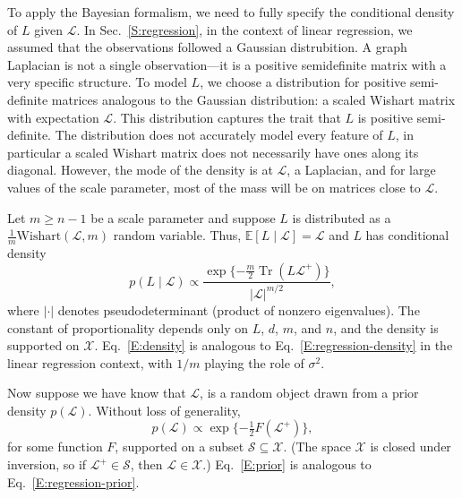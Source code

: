 \documentclass[12pt]{article}
\DeclareMathOperator*{\Tr}{Tr}
\newcommand{\E}{\mathbb{E}}
\theoremstyle{plain}
\begin{document}
To apply the Bayesian formalism, we need to fully specify the
conditional density of $L$ given $\mathcal{L}$.  In
Sec.~\ref{S:regression}, in the context of linear regression, we
assumed that the observations followed a Gaussian distrubition.  A
graph Laplacian is not a single observation---it is a positive
semidefinite matrix with a very specific structure.  To model $L$, we
choose a distribution for positive semi-definite matrices analogous to
the Gaussian distribution: a scaled Wishart matrix with expectation
$\mathcal{L}$.  This distribution captures the trait that $L$ is
positive semi-definite.  The distribution does not accurately model
every feature of $L$, in particular a scaled Wishart matrix does not
necessarily have ones along its diagonal.  However, the mode of the
density is at $\mathcal{L}$, a Laplacian, and for large values of the
scale parameter, most of the mass will be on matrices close to
$\mathcal{L}$.

Let $m \geq n - 1$ be a scale parameter
and suppose $L$ is distributed as a
$\tfrac{1}{m} \mathrm{Wishart}(\mathcal{L}, m)$ random variable.
Thus, $\E[L \mid \mathcal{L}] = \mathcal{L}$ and $L$ has conditional density
\begin{equation}\label{E:density}
  p(L \mid \mathcal{L})
    \propto
      \frac{\exp\{ -\frac{m}{2} \Tr(L \mathcal{L}^+)\}}
           {|\mathcal{L}|^{m/2}},
\end{equation}
where $|\cdot|$ denotes pseudodeterminant (product of nonzero
eigenvalues).  The constant of proportionality depends only on $L$,
$d$, $m$, and $n$, and the density is supported on $\mathcal{X}$.
Eq.~\eqref{E:density} is analogous to Eq.~\eqref{E:regression-density}
in the linear regression context, with $1/m$ playing the role of
$\sigma^2$.

Now suppose we have know that $\mathcal{L}$, is a random object drawn
from a prior density $p(\mathcal{L})$.
Without loss of generality,
\begin{equation}\label{E:prior}
  p(\mathcal{L}) \propto \exp\{ -\tfrac{1}{2} F(\mathcal{L}^+) \},
\end{equation}
for some function $F$, supported on a subset
$\mathcal{S} \subseteq \mathcal{X}$.  (The space $\mathcal{X}$ is
closed under inversion, so if $\mathcal{L}^{+} \in \mathcal{S}$, then
$\mathcal{L} \in \mathcal{X}$.)
Eq.~\eqref{E:prior} is analogous to Eq.~\eqref{E:regression-prior}.
\end{document}
